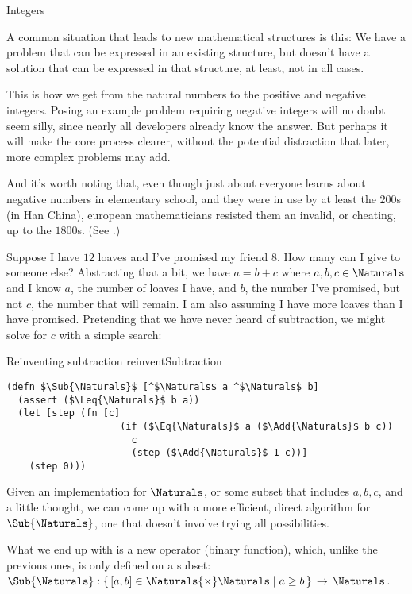 \documentclass[12pt]{PalisadesLakesBook}
\begin{document}
\begin{plSection}{Integers}

A common situation that leads to new mathematical structures
is this:
We have a problem that can be expressed in an existing structure,
but doesn't have a solution that can be expressed 
in that structure, at least, not in all cases.

This is how we get from the natural numbers to the positive
and negative integers.
Posing an example problem requiring
negative integers will no doubt seem silly,
since nearly all developers already know the answer.
But perhaps it will make the core process clearer,
without the potential distraction that later,
more complex problems may add.

And it's worth noting that, even though just about everyone learns
about negative numbers in elementary school,
and they were in use by at least the $200$s (in Han China),
european mathematicians resisted them
an invalid, or cheating, up to the $1800$s. 
(See .)

Suppose I have $12$ loaves and I've promised 
my friend $8$. How many can I give to someone else?
Abstracting that a bit,
we have
$a = b + c$
where $a,b,c \in \Naturals$ and I know 
$a$, the number of loaves I have, 
and $b$, the number I've promised,
but not $c$, the number that will remain.
I am also assuming I have more loaves than I have promised.
Pretending that we have never heard of subtraction,
we might solve for $c$ with a simple search:

\begin{plAlgorithm}
{Reinventing subtraction}
{reinventSubtraction}
\begin{lstlisting}[language=pseudocode]
(defn $\Sub{\Naturals}$ [^$\Naturals$ a ^$\Naturals$ b]
  (assert ($\Leq{\Naturals}$ b a))
  (let [step (fn [c]
                    (if ($\Eq{\Naturals}$ a ($\Add{\Naturals}$ b c))
                      c
                      (step ($\Add{\Naturals}$ 1 c))]
    (step 0)))
\end{lstlisting}
\end{plAlgorithm}

Given an implementation for $\Naturals$, or some subset that
includes $a,b,c$, and a little thought, 
we can come up with a more efficient, direct algorithm 
for $\Sub{\Naturals}$, one that doesn't involve trying all 
possibilities.

What we end up with is a new operator (binary function),
which, unlike the previous ones, is only defined on a 
subset:
$\Sub{\Naturals}:
\left\{ \, [a,b] \in \Naturals{\times}\Naturals 
\; \middle|  \; a \geq b \, \right\} \, \rightarrow \, \Naturals$.


\end{plSection}
\end{document}
